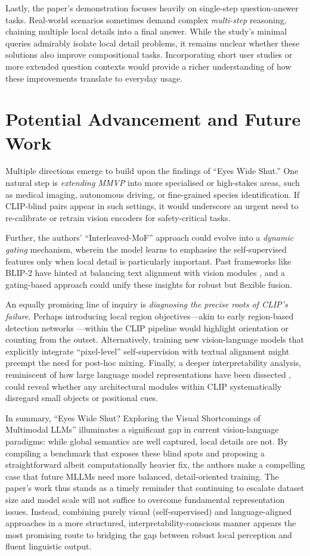 \documentclass[11pt]{article}
\begin{document}
Lastly, the paper's demonstration focuses heavily on single-step question-answer tasks. Real-world scenarios sometimes demand complex \emph{multi-step} reasoning, chaining multiple local details into a final answer. While the study's minimal queries admirably isolate local detail problems, it remains unclear whether these solutions also improve compositional tasks. Incorporating short user studies or more extended question contexts would provide a richer understanding of how these improvements translate to everyday usage.

\section*{Potential Advancement and Future Work}
Multiple directions emerge to build upon the findings of ``Eyes Wide Shut.'' One natural step is \emph{extending MMVP} into more specialised or high-stakes areas, such as medical imaging, autonomous driving, or fine-grained species identification. If CLIP-blind pairs appear in such settings, it would underscore an urgent need to re-calibrate or retrain vision encoders for safety-critical tasks.

Further, the authors' ``Interleaved-MoF'' approach could evolve into a \emph{dynamic gating} mechanism, wherein the model learns to emphasise the self-supervised features only when local detail is particularly important. Past frameworks like BLIP-2 have hinted at balancing text alignment with vision modules \cite{Li2023ICML_BLIP2}, and a gating-based approach could unify these insights for robust but flexible fusion.

An equally promising line of inquiry is \emph{diagnosing the precise roots of CLIP's failure}. Perhaps introducing local region objectives---akin to early region-based detection networks \cite{Girshick2014CVPR,Lin2017CVPR_FPN}---within the CLIP pipeline would highlight orientation or counting from the outset. Alternatively, training new vision-language models that explicitly integrate ``pixel-level'' self-supervision with textual alignment might preempt the need for post-hoc mixing. Finally, a deeper interpretability analysis, reminiscent of how large language model representations have been dissected \cite{Devlin2019NAACL_BERT}, could reveal whether any architectural modules within CLIP systematically disregard small objects or positional cues.

In summary, ``Eyes Wide Shut? Exploring the Visual Shortcomings of Multimodal LLMs'' illuminates a significant gap in current vision-language paradigms: while global semantics are well captured, local details are not. By compiling a benchmark that exposes these blind spots and proposing a straightforward albeit computationally heavier fix, the authors make a compelling case that future MLLMs need more balanced, detail-oriented training. The paper's work thus stands as a timely reminder that continuing to escalate dataset size and model scale will not suffice to overcome fundamental representation issues. Instead, combining purely visual (self-supervised) and language-aligned approaches in a more structured, interpretability-conscious manner appears the most promising route to bridging the gap between robust local perception and fluent linguistic output.
\end{document}

